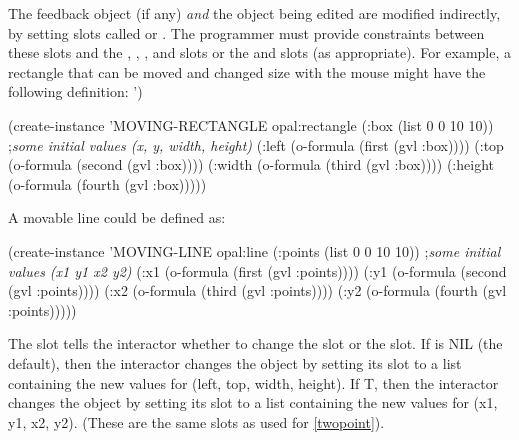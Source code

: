 The feedback object (if any) {\it and}
the object being edited are modified indirectly, by setting slots called
 or .  The programmer must provide constraints between
these slots and the , , , and
 slots or the  and  slots (as
appropriate).  For example, a rectangle that can be moved and changed
size with the mouse might have the following definition:
\label{howobjsdefined}
')
\begin{programexample}
(create-instance 'MOVING-RECTANGLE opal:rectangle
   (:box (list 0 0 10 10))  ;{\it some initial values (x, y, width, height)}
   (:left (o-formula (first (gvl :box))))
   (:top (o-formula (second (gvl :box))))
   (:width (o-formula (third (gvl :box))))
   (:height (o-formula (fourth (gvl :box)))))
\end{programexample}
A movable line could be defined as:
\begin{programexample}
(create-instance 'MOVING-LINE opal:line
   (:points (list 0 0 10 10))  ;{\it some initial values (x1 y1 x2 y2)}
   (:x1 (o-formula (first (gvl :points))))
   (:y1 (o-formula (second (gvl :points))))
   (:x2 (o-formula (third (gvl :points))))
   (:y2 (o-formula (fourth (gvl :points)))))
\end{programexample}

The slot  tells the interactor whether to change the 
slot or the  slot.
If  is NIL (the default), then the interactor changes the
object by setting its
 slot to a list containing the new values for (left, top, width,
height).  If T, then the interactor changes the object by setting its
 slot to a list containing the new values for (x1, y1, x2, y2).
(These are the same slots as used for
\dashsection \ref{twopoint}).

